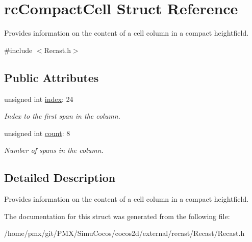 \hypertarget{structrcCompactCell}{}\section{rc\+Compact\+Cell Struct Reference}
\label{structrcCompactCell}


Provides information on the content of a cell column in a compact heightfield.  




{\ttfamily \#include $<$Recast.\+h$>$}

\subsection*{Public Attributes}
\begin{DoxyCompactItemize}
\item 
\mbox{\label{structrcCompactCell_ad1695135ae520dfee8c39aa7b1fd41d8}} 
unsigned int \hyperlink{structrcCompactCell_ad1695135ae520dfee8c39aa7b1fd41d8}{index}\+: 24
\begin{DoxyCompactList}\small\item\em Index to the first span in the column. \end{DoxyCompactList}\item 
\mbox{\label{structrcCompactCell_a70bb509654a28a8c9d67bcb469d0b3ce}} 
unsigned int \hyperlink{structrcCompactCell_a70bb509654a28a8c9d67bcb469d0b3ce}{count}\+: 8
\begin{DoxyCompactList}\small\item\em Number of spans in the column. \end{DoxyCompactList}\end{DoxyCompactItemize}


\subsection{Detailed Description}
Provides information on the content of a cell column in a compact heightfield. 

The documentation for this struct was generated from the following file\+:\begin{DoxyCompactItemize}
\item 
/home/pmx/git/\+P\+M\+X/\+Simu\+Cocos/cocos2d/external/recast/\+Recast/Recast.\+h\end{DoxyCompactItemize}
